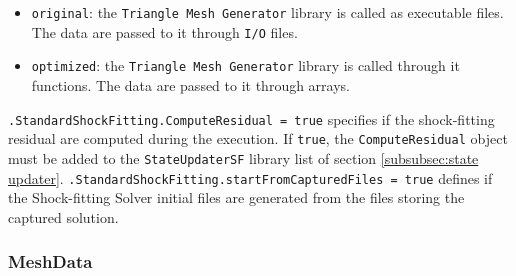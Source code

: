 \documentclass[11pt,a4paper,oneside]{article}
\begin{document}
\begin{itemize}
\item{\texttt{original}: the \texttt{Triangle Mesh Generator} library is called as executable files. The data are passed to it through \texttt{I/O} files.}
\item{\texttt{optimized}: the \texttt{Triangle Mesh Generator} library is called through it functions. The data are passed to it through arrays.}
\end{itemize}

\hspace*{1cm} \texttt{.StandardShockFitting.ComputeResidual = true}
\newline
\newline
specifies if the shock-fitting residual are computed during the execution. If \texttt{true}, the \texttt{ComputeResidual} object must be added to the \texttt{StateUpdaterSF} library list of section \ref{subsubsec:state updater}.
\newline
\newline
\hspace*{1cm} \texttt{.StandardShockFitting.startFromCapturedFiles = true}
\newline
\newline
defines if the Shock-fitting Solver initial files are generated from the files storing the captured solution.

\subsubsection*{MeshData}
\end{document}
